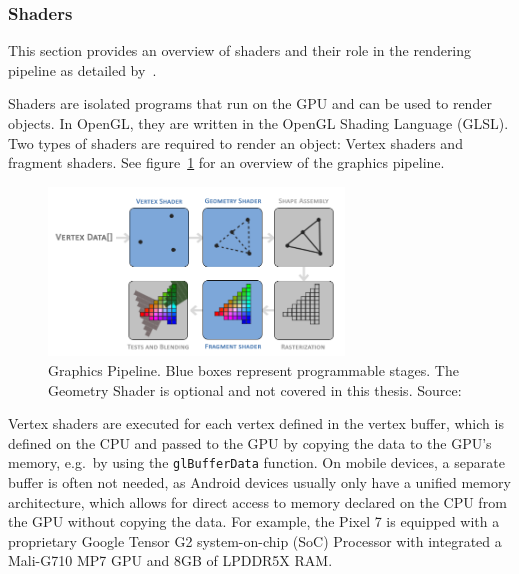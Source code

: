 \subsubsection{Shaders}\label{subsec:shaders}

This section provides an overview of shaders and their role in the rendering pipeline as detailed by~\cite{de_vries_learn_2020}.

Shaders are isolated programs that run on the GPU and can be used to render objects.
In OpenGL, they are written in the OpenGL Shading Language (GLSL).
Two types of shaders are required to render an object: Vertex shaders and fragment shaders.
See figure~\ref{fig:graphics-pipeline} for an overview of the graphics pipeline.
\begin{figure}[h!]
    \centering
    \includegraphics[width=0.70\textwidth]{images/graphics-pipeline}
    \caption{Graphics Pipeline. Blue boxes represent programmable stages. The Geometry Shader is optional and not covered in this thesis. Source:~\cite{de_vries_learn_2020}}
    \label{fig:graphics-pipeline}
\end{figure}

Vertex shaders are executed for each vertex defined in the vertex buffer, which is defined on the CPU and
passed to the GPU by copying the data to the GPU's memory, e.g.\ by using the \texttt{glBufferData} function.
On mobile devices, a separate buffer is often not needed, as Android devices usually only have a unified memory architecture,
which allows for direct access to memory declared on the CPU from the GPU without copying the data.
For example, the Pixel 7 is equipped with a proprietary Google Tensor G2 system-on-chip (SoC) Processor with integrated a
Mali-G710 MP7 GPU and 8GB of LPDDR5X RAM\@{}.

